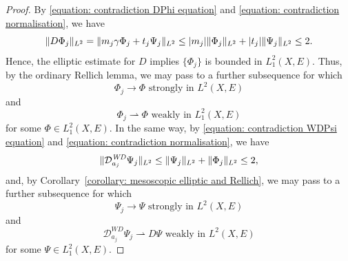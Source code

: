 \documentclass[a4paper,oneside,12pt]{amsart}
\theoremstyle{plain}
\theoremstyle{definition}
\theoremstyle{remark}
\DeclarePairedDelimiter{\abs}{\lvert}{\rvert}
\DeclarePairedDelimiter{\norm}{\lVert}{\rVert}
\newcommand{\Ltwonorm}[2][L^2]{\norm{#2}_{#1}}
\newcommand{\mesoscopicWilsonDiracoperator}[1][a]{\mathcal{D}_{#1}^{\mathit{WD}}}
\begin{document}
\begin{proof}
  By \eqref{equation: contradiction DPhi equation} and \eqref{equation: contradiction normalisation}, we have
  \begin{equation}
    \Ltwonorm{D\Phi_j} = \Ltwonorm{m_j \gamma \Phi_j + t_j \Psi_j} \le \abs{m_j}\Ltwonorm{\Phi_j} + \abs{t_j}\Ltwonorm{\Psi_j} \le 2.
  \end{equation}
  Hence, the elliptic estimate for $D$ implies $\{\Phi_j\}$ is bounded in $L^2_1(X,E)$.
  Thus, by the ordinary Rellich lemma, we may pass to a further subsequence for which
  \begin{equation}\label{equation: strong convergence Phij}
    \Phi_j \to \Phi \text{ strongly in } L^2(X,E)
  \end{equation}
  and
  \begin{equation}\label{equation: weak convergence Phij}
    \Phi_j \rightharpoonup \Phi \text{ weakly in } L^2_1(X,E)
  \end{equation}
  for some $\Phi \in L^2_1(X,E)$.
  In the same way, by \eqref{equation: contradiction WDPsi equation} and \eqref{equation: contradiction normalisation}, we have
  \begin{equation}
    \Ltwonorm{\mesoscopicWilsonDiracoperator[a_j] \Psi_j} \le \Ltwonorm{\Psi_j} + \Ltwonorm{\Phi_j} \le 2,
  \end{equation}
  and, by Corollary~\ref{corollary: mesoscopic elliptic and Rellich}, we may pass to a further subsequence for which
  \begin{equation}\label{equation: strong convergence Psij}
    \Psi_j \to \Psi \text{ strongly in } L^2(X,E)
  \end{equation}
  and
  \begin{equation}\label{equation: weak convergence Psij}
    \mesoscopicWilsonDiracoperator[a_j]\Psi_j \rightharpoonup D\Psi \text{ weakly in } L^2(X,E)
  \end{equation}
  for some $\Psi \in L^2_1(X,E)$.


\end{proof}
\end{document}
